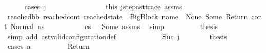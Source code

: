 \begin{isabellebody}
\ \ \ \ \isamarkupfalse%
\ {\isacharparenleft}{\kern0pt}cases\ j{\isacharparenright}{\kern0pt}\isanewline
\ \ \ \ \ \ \isamarkupfalse%
\ {}\isanewline
\ \ \ \ \ \ \isamarkupfalse%
\ this\ j{\isacharunderscore}{\kern0pt}step{\isacharunderscore}{\kern0pt}ast{\isacharunderscore}{\kern0pt}trace\ assms{\isacharparenleft}{\kern0pt}{}{\isacharparenright}{\kern0pt}\ \isanewline
\ \ \ \ \ \ \isamarkupfalse%
\ {\isachardoublequoteopen}{\isacharparenleft}{\kern0pt}reached{\isacharunderscore}{\kern0pt}bb{\isacharcomma}{\kern0pt}\ reached{\isacharunderscore}{\kern0pt}cont{\isacharcomma}{\kern0pt}\ reached{\isacharunderscore}{\kern0pt}state{\isacharparenright}{\kern0pt}\ {\isacharequal}{\kern0pt}\ {\isacharparenleft}{\kern0pt}{\isacharparenleft}{\kern0pt}BigBlock\ name\ {\isacharbrackleft}{\kern0pt}{\isacharbrackright}{\kern0pt}\ None\ {\isacharparenleft}{\kern0pt}Some\ Return{\isacharparenright}{\kern0pt}{\isacharparenright}{\kern0pt}{\isacharcomma}{\kern0pt}\ cont{}{\isacharcomma}{\kern0pt}\ {\isacharparenleft}{\kern0pt}Normal\ ns{}{\isacharparenright}{\kern0pt}{\isacharparenright}{\kern0pt}{\isachardoublequoteclose}\ \isanewline
\ \ \ \ \ \ \ \ \isamarkupfalse%
\ {\isacartoucheopen}cs{}\ {\isacharequal}{\kern0pt}\ {\isacharbrackleft}{\kern0pt}{\isacharbrackright}{\kern0pt}{\isacartoucheclose}\ Some\ assms{\isacharparenleft}{\kern0pt}{}{\isacharparenright}{\kern0pt}\ \isamarkupfalse%
\ simp\isanewline
\ \ \ \ \ \ \isamarkupfalse%
\ \isamarkupfalse%
\ {\isacharquery}{\kern0pt}thesis\ \isamarkupfalse%
\ {\isacharparenleft}{\kern0pt}simp\ add{\isacharcolon}{\kern0pt}\ ast{\isacharunderscore}{\kern0pt}valid{\isacharunderscore}{\kern0pt}configuration{\isacharunderscore}{\kern0pt}def{\isacharparenright}{\kern0pt}\isanewline
\ \ \ \ \isamarkupfalse%
\isanewline
\ \ \ \ \ \ \isamarkupfalse%
\ {\isacharparenleft}{\kern0pt}Suc\ j{\isacharprime}{\kern0pt}{\isacharparenright}{\kern0pt}\isanewline
\ \ \ \ \ \ \isamarkupfalse%
\ {\isacharquery}{\kern0pt}thesis\ \isanewline
\ \ \ \ \ \ \isamarkupfalse%
\ {\isacharparenleft}{\kern0pt}cases\ a{\isacharparenright}{\kern0pt}\isanewline
\ \ \ \ \ \ \ \ \isamarkupfalse%
\ {\isacharparenleft}{\kern0pt}Return{\isacharparenright}{\kern0pt}\ \isanewline
\ \ \ \ \ \ \ \ \isamarkupfalse%

\end{isabellebody}
